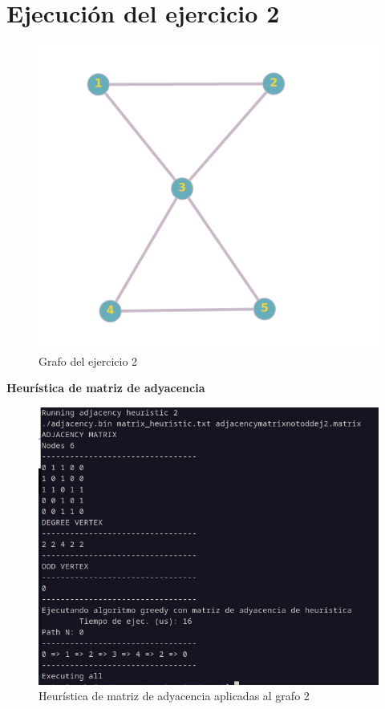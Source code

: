 \newpage
\section{Ejecución del ejercicio 2}

\begin{figure}[H]
	\centering
	\includegraphics[scale=0.40]{grafo_ejercicio2}
	\caption{Grafo del ejercicio 2}
\end{figure}

\textbf{Heurística de matriz de adyacencia}

\begin{figure}[H]
	\centering
	\includegraphics[scale=0.40]{adjacency2}
	\caption{Heurística de matriz de adyacencia aplicadas al grafo 2}
\end{figure}

